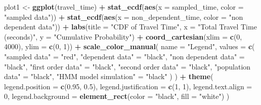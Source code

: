 \documentclass[
]{article}
\newenvironment{Shaded}{\begin{snugshade}}{\end{snugshade}}
\newcommand{\AttributeTok}[1]{\textcolor[rgb]{0.13,0.29,0.53}{#1}}
\newcommand{\DecValTok}[1]{\textcolor[rgb]{0.00,0.00,0.81}{#1}}
\newcommand{\FloatTok}[1]{\textcolor[rgb]{0.00,0.00,0.81}{#1}}
\newcommand{\FunctionTok}[1]{\textcolor[rgb]{0.13,0.29,0.53}{\textbf{#1}}}
\newcommand{\NormalTok}[1]{#1}
\newcommand{\OtherTok}[1]{\textcolor[rgb]{0.56,0.35,0.01}{#1}}
\newcommand{\SpecialCharTok}[1]{\textcolor[rgb]{0.81,0.36,0.00}{\textbf{#1}}}
\newcommand{\StringTok}[1]{\textcolor[rgb]{0.31,0.60,0.02}{#1}}
\begin{document}
\begin{Shaded}
\begin{Highlighting}[]
\NormalTok{plot1 }\OtherTok{\textless{}{-}} \FunctionTok{ggplot}\NormalTok{(travel\_time) }\SpecialCharTok{+}
  \FunctionTok{stat\_ecdf}\NormalTok{(}\FunctionTok{aes}\NormalTok{(}\AttributeTok{x =}\NormalTok{ sampled\_time, }\AttributeTok{color =} \StringTok{"sampled data"}\NormalTok{)) }\SpecialCharTok{+}
  \FunctionTok{stat\_ecdf}\NormalTok{(}\FunctionTok{aes}\NormalTok{(}\AttributeTok{x =}\NormalTok{ non\_dependent\_time, }\AttributeTok{color =} \StringTok{"non dependent data"}\NormalTok{)) }\SpecialCharTok{+}
  \FunctionTok{labs}\NormalTok{(}\AttributeTok{title =} \StringTok{"CDF of Travel Time"}\NormalTok{, }\AttributeTok{x =} \StringTok{"Total Travel Time (seconds)"}\NormalTok{, }\AttributeTok{y =} \StringTok{"Cumulative Probability"}\NormalTok{) }\SpecialCharTok{+}
  \FunctionTok{coord\_cartesian}\NormalTok{(}\AttributeTok{xlim =} \FunctionTok{c}\NormalTok{(}\DecValTok{0}\NormalTok{, }\DecValTok{4000}\NormalTok{), }\AttributeTok{ylim =} \FunctionTok{c}\NormalTok{(}\DecValTok{0}\NormalTok{, }\DecValTok{1}\NormalTok{)) }\SpecialCharTok{+}
  \FunctionTok{scale\_color\_manual}\NormalTok{(}
    \AttributeTok{name =} \StringTok{"Legend"}\NormalTok{,}
    \AttributeTok{values =} \FunctionTok{c}\NormalTok{(}
      \StringTok{"sampled data"} \OtherTok{=} \StringTok{"red"}\NormalTok{,}
      \StringTok{"dependent data"} \OtherTok{=} \StringTok{"black"}\NormalTok{,}
      \StringTok{"non dependent data"} \OtherTok{=} \StringTok{"black"}\NormalTok{,}
      \StringTok{"first order data"} \OtherTok{=} \StringTok{"black"}\NormalTok{,}
      \StringTok{"second order data"} \OtherTok{=} \StringTok{"black"}\NormalTok{,}
      \StringTok{"population data"} \OtherTok{=} \StringTok{"black"}\NormalTok{,}
      \StringTok{"HMM model simulation"} \OtherTok{=} \StringTok{"black"}
\NormalTok{    )}
\NormalTok{  ) }\SpecialCharTok{+}
  \FunctionTok{theme}\NormalTok{(}
    \AttributeTok{legend.position =} \FunctionTok{c}\NormalTok{(}\FloatTok{0.95}\NormalTok{, }\FloatTok{0.5}\NormalTok{),}
    \AttributeTok{legend.justification =} \FunctionTok{c}\NormalTok{(}\DecValTok{1}\NormalTok{, }\DecValTok{1}\NormalTok{),}
    \AttributeTok{legend.text.align =} \DecValTok{0}\NormalTok{,}
    \AttributeTok{legend.background =} \FunctionTok{element\_rect}\NormalTok{(}\AttributeTok{color =} \StringTok{"black"}\NormalTok{, }\AttributeTok{fill =} \StringTok{"white"}\NormalTok{)}
\NormalTok{  )}
\end{Highlighting}
\end{Shaded}
\end{document}
